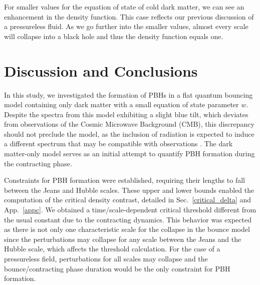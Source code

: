 \documentclass[a4paper,11pt]{article}
\begin{document}
For smaller values for the equation of state of cold dark matter, we can see an
enhancement in the density function.  This case reflects our previous discussion of a
pressureless fluid. As we go further into the smaller values, almost every scale will
collapse into a black hole and thus the density function equals one.



\section{Discussion and Conclusions}
\label{sec:discussion}

In this study, we investigated the formation of PBHs in a flat quantum bouncing model
containing only dark matter with a small equation of state parameter $w$. Despite the
spectra from this model exhibiting a slight blue tilt, which deviates from observations
of the Cosmic Microwave Background (CMB), this discrepancy should not preclude the
model, as the inclusion of radiation is expected to induce a different spectrum that may
be compatible with observations \cite{Vitenti2012}. The dark matter-only model serves as
an initial attempt to quantify PBH formation during the contracting phase.

Constraints for PBH formation were established, requiring their lengths to fall between
the Jeans and Hubble scales. These upper and lower bounds enabled the computation of the
critical density contrast, detailed in Sec.~\ref{critical_delta} and App.~\ref{appc}. We
obtained a time/scale-dependent critical threshold different from the usual constant due
to the contracting dynamics. This behavior was expected as there is not only one
characteristic scale for the collapse in the bounce model since the perturbations may
collapse for any scale between the Jeans and the Hubble scale, which affects the
threshold calculation. For the case of a pressureless field, perturbations for all
scales may collapse and the bounce/contracting phase duration would be the only
constraint for PBH formation.
\end{document}

